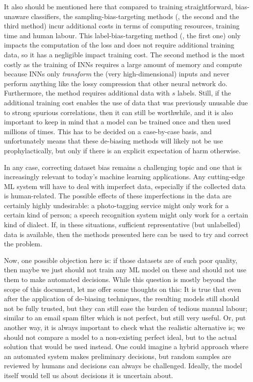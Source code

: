 It also should be mentioned here that compared to training straightforward, bias-unaware classifiers,
the sampling-bias-targeting methods (\ie, the second and the third method)
incur additional costs in terms of computing resources, training time and human labour.
This label-bias-targeting method (\ie, the first one) only impacts the computation of the loss
and does not require additional training data,
so it has a negligible impact training cost.
The second method is the most costly
as the training of \acp{INN} requires a large amount of memory and compute
because \acp{INN} only \emph{transform} the (very high-dimensional) inputs
and never perform anything like the lossy compression that other neural network do.
Furthermore, the method requires additional data with \(s\) labels.
Still, if the additional training cost enables the use of data
that was previously unusable due to strong spurious correlations,
then it can still be worthwhile,
and it is also important to keep in mind that a model can be trained once
and then used millions of times.
This has to be decided on a case-by-case basis,
and unfortunately means that these de-biasing methods will likely not be use prophylactically,
but only if there is an explicit expectation of harm otherwise.

In any case, correcting dataset bias remains a challenging topic
and one that is increasingly relevant to today's machine learning applications.
Any cutting-edge \ac{ML} system will have to deal with imperfect data,
especially if the collected data is human-related.
The possible effects of these imperfections in the data are certainly highly undesirable:
a photo-tagging service might only work for a certain kind of person;
a speech recognition system might only work for a certain kind of dialect.
If, in these situations, sufficient representative (but unlabelled) data is available,
then the methods presented here can be used to try and correct the problem.

Now, one possible objection here is:
if those datasets are of such poor quality,
then maybe we just should not train any \ac{ML} model on these and should not use them to make automated decisions.
While this question is mostly beyond the scope of this document, let me offer some thoughts on this:
It is true that even after the application of de-biasing techniques,
the resulting models still should not be fully trusted,
but they can still ease the burden of tedious manual labour;
similar to an email spam filter which is not perfect, but still very useful.
Or, put another way, it is always important to check what the realistic alternative is;
we should not compare a model to a non-existing perfect ideal, but to the actual solution that would be used instead.
One could imagine a hybrid approach where an automated system makes preliminary decisions,
but random samples are reviewed by humans and decisions can always be challenged.
Ideally, the model itself would tell us about decisions it is uncertain about.

